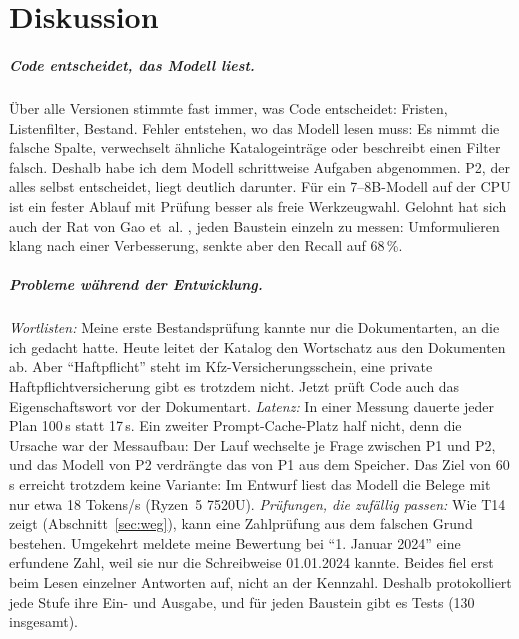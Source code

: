
\chapter{Diskussion}
\label{chap:diskussion}

\paragraph{Code entscheidet, das Modell liest.} Über alle Versionen stimmte fast immer, was Code entscheidet: Fristen, Listenfilter, Bestand. Fehler entstehen, wo das Modell lesen muss: Es nimmt die falsche Spalte, verwechselt ähnliche Katalogeinträge oder beschreibt einen Filter falsch. Deshalb habe ich dem Modell schrittweise Aufgaben abgenommen. P2, der alles selbst entscheidet, liegt deutlich darunter. Für ein 7--8B-Modell auf der CPU ist ein fester Ablauf mit Prüfung besser als freie Werkzeugwahl. Gelohnt hat sich auch der Rat von Gao et~al. \cite{gao2023}, jeden Baustein einzeln zu messen: Umformulieren klang nach einer Verbesserung, senkte aber den Recall auf 68\,\%.

\paragraph{Probleme während der Entwicklung.} \emph{Wortlisten:} Meine erste Bestandsprüfung kannte nur die Dokumentarten, an die ich gedacht hatte. Heute leitet der Katalog den Wortschatz aus den Dokumenten ab. Aber \enquote{Haftpflicht} steht im Kfz-Versicherungsschein, eine private Haftpflichtversicherung gibt es trotzdem nicht. Jetzt prüft Code auch das Eigenschaftswort vor der Dokumentart. \emph{Latenz:} In einer Messung dauerte jeder Plan 100\,s statt 17\,s. Ein zweiter Prompt-Cache-Platz half nicht, denn die Ursache war der Messaufbau: Der Lauf wechselte je Frage zwischen P1 und P2, und das Modell von P2 verdrängte das von P1 aus dem Speicher. Das Ziel von 60\,s erreicht trotzdem keine Variante: Im Entwurf liest das Modell die Belege mit nur etwa 18 Tokens/s (Ryzen~5 7520U). \emph{Prüfungen, die zufällig passen:} Wie T14 zeigt (Abschnitt~\ref{sec:weg}), kann eine Zahlprüfung aus dem falschen Grund bestehen. Umgekehrt meldete meine Bewertung bei \enquote{1. Januar 2024} eine erfundene Zahl, weil sie nur die Schreibweise 01.01.2024 kannte. Beides fiel erst beim Lesen einzelner Antworten auf, nicht an der Kennzahl. Deshalb protokolliert jede Stufe ihre Ein- und Ausgabe, und für jeden Baustein gibt es Tests (130 insgesamt).
